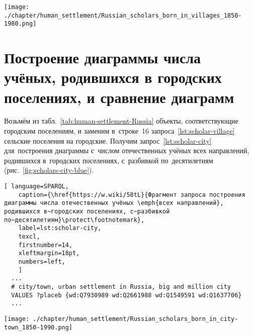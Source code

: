 \begin{figure*}
    \texttt{[image: ./chapter/human\_settlement/Russian\_scholars\_born\_in\_villages\_1850-1980.png]}%
	\label{fig:scholars-village-blue}
    \caption[Количество отечественных учёных, родившихся в сёлах, 2022 год.]
    {Количество отечественных учёных \emph{всех направлений}, 
    родившихся в~сельских поселениях с~1850-х по~1980-е годы, 2022 год}%
%
\end{figure*} 






\section{Построение диаграммы числа учёных, родившихся в городских поселениях, и сравнение диаграмм}

Возьмём из табл.~\ref{tab:human-settlement-Russia} объекты, соответствующие городским поселениям, 
и заменим в~строке~16 запроса~\ref{lst:scholar-village} сельские поселения на городские. 
Получим запрос~\ref{lst:scholar-city} для~построения диаграммы 
с~числом отечественных учёных всех направлений, родившихся в~городских поселениях, 
с~разбивкой по~десятилетиям (рис.~\ref{fig:scholars-city-blue}). 


\begin{lstlisting}[ language=SPARQL, 
    caption={\href{https://w.wiki/58tL}{Фрагмент запроса построения диаграммы числа отечественных учёных \emph{всех направлений}, родившихся в~городских поселениях, с~разбивкой по~десятилетиям}\protect\footnotemark},
    label=lst:scholar-city,
    texcl, 
    firstnumber=14,
    xleftmargin=18pt, 
    numbers=left,
    ]
  ...
  # city/town, urban settlement in Russia, big and million city
  VALUES ?placeb {wd:Q7930989 wd:Q2661988 wd:Q1549591 wd:Q1637706}
  ...
\end{lstlisting}%


\begin{figure*}
    \texttt{[image: ./chapter/human\_settlement/Russian\_scholars\_born\_in\_city-town\_1850-1990.png]}%
	\label{fig:scholars-city-blue}
    \caption[Количество отечественных учёных, родившихся в городах, 2022 год.]
    {Количество отечественных учёных, 
    родившихся в городских поселениях с~1850-х по~1990-е годы, 2022 год}%
%
\end{figure*} 


